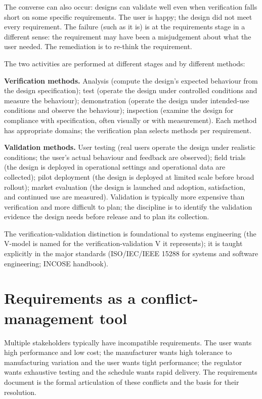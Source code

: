 The converse can also occur: designs can validate well even when verification falls short on some specific requirements. The user is happy; the design did not meet every requirement. The failure (such as it is) is at the requirements stage in a different sense: the requirement may have been a misjudgement about what the user needed. The remediation is to re-think the requirement.

The two activities are performed at different stages and by different methods:

\textbf{Verification methods.} Analysis (compute the design's expected behaviour from the design specification); test (operate the design under controlled conditions and measure the behaviour); demonstration (operate the design under intended-use conditions and observe the behaviour); inspection (examine the design for compliance with specification, often visually or with measurement). Each method has appropriate domains; the verification plan selects methods per requirement.

\textbf{Validation methods.} User testing (real users operate the design under realistic conditions; the user's actual behaviour and feedback are observed); field trials (the design is deployed in operational settings and operational data are collected); pilot deployment (the design is deployed at limited scale before broad rollout); market evaluation (the design is launched and adoption, satisfaction, and continued use are measured). Validation is typically more expensive than verification and more difficult to plan; the discipline is to identify the validation evidence the design needs before release and to plan its collection.

The verification-validation distinction is foundational to systems engineering (the V-model is named for the verification-validation V it represents); it is taught explicitly in the major standards (ISO/IEC/IEEE 15288 for systems and software engineering; INCOSE handbook).

\section{Requirements as a conflict-management tool}

Multiple stakeholders typically have incompatible requirements. The user wants high performance and low cost; the manufacturer wants high tolerance to manufacturing variation and the user wants tight performance; the regulator wants exhaustive testing and the schedule wants rapid delivery. The requirements document is the formal articulation of these conflicts and the basis for their resolution.

